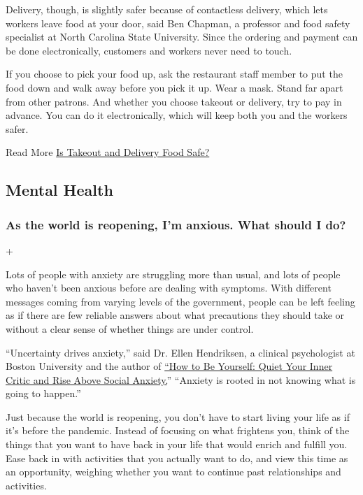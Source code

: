 Delivery, though, is slightly safer because of contactless delivery,
which lets workers leave food at your door, said Ben Chapman, a
professor and food safety specialist at North Carolina State University.
Since the ordering and payment can be done electronically, customers and
workers never need to touch.

If you choose to pick your food up, ask the restaurant staff member to
put the food down and walk away before you pick it up. Wear a mask.
Stand far apart from other patrons. And whether you choose takeout or
delivery, try to pay in advance. You can do it electronically, which
will keep both you and the workers safer.

 Read More
\href{https://www.nytimes3xbfgragh.onion/2020/05/27/dining/takeout-delivery-safety-coronavirus.html}{Is
Takeout and Delivery Food Safe?}

\hypertarget{mental-health}{%
\subsection{Mental Health}\label{mental-health}}

\hypertarget{as-the-world-is-reopening-im-anxious-what-should-i-do}{%
\subsubsection{As the world is reopening, I'm anxious. What should I
do?}\label{as-the-world-is-reopening-im-anxious-what-should-i-do}}

+

Lots of people with anxiety are struggling more than usual, and lots of
people who haven't been anxious before are dealing with symptoms. With
different messages coming from varying levels of the government, people
can be left feeling as if there are few reliable answers about what
precautions they should take or without a clear sense of whether things
are under control.

``Uncertainty drives anxiety,'' said Dr. Ellen Hendriksen, a clinical
psychologist at Boston University and the author of
\href{https://us.macmillan.com/books/9781250161703}{``How to Be
Yourself: Quiet Your Inner Critic and Rise Above Social Anxiety.}''
``Anxiety is rooted in not knowing what is going to happen.''

Just because the world is reopening, you don't have to start living your
life as if it's before the pandemic. Instead of focusing on what
frightens you, think of the things that you want to have back in your
life that would enrich and fulfill you. Ease back in with activities
that you actually want to do, and view this time as an opportunity,
weighing whether you want to continue past relationships and activities.

